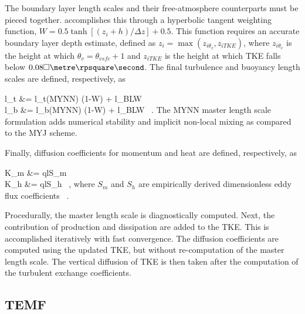 The boundary layer length scales and their free-atmosphere counterparts must be pieced together.  \citet{OlsonBrown2011} accomplishes this through a hyperbolic tangent weighting function, $W = 0.5 \tanh [ (z_i + h) / \Delta z] + 0.5$. This function requires an accurate boundary layer depth estimate, defined as $z_i = \max \left(z_{i\theta_v},z_{iTKE}\right)$, where $ z_{i\theta_v}$ is the height at which $\theta_v = \theta_{vsfc} +1$ and $z_{iTKE}$ is the height at which TKE falls below $0.08  \square\metre \rpsquare\second$. The final turbulence and buoyancy length scales are defined, respectively, as


\bse \label{equation354}
\bal
l_t &= l_{t(MYNN)} (1-W) + l_{BL}W \label{equation354a} \\
l_b &= l_{b(MYNN)} (1-W) + l_{BL}W \label{equation354b} \mbox{ .}
\eal
\ese
\noindent
 The MYNN master length scale formulation adds numerical stability and implicit non-local mixing as compared to the MYJ scheme.

Finally, diffusion coefficients for momentum and heat are defined, respectively, as

\bse \label{equation355}
\bal
K_m &= qlS_m \label{equation355a} \\
K_h &= qlS_h \label{equation355b} \mbox{ ,}
\eal
\ese
\noindent
 where $S_m$ and $S_h$ are empirically derived dimensionless eddy flux coefficients ~\citep{HL1988}.

Procedurally, the master length scale is diagnostically computed. Next, the contribution of production and dissipation are added to the TKE. This is accomplished iteratively with fast convergence. The diffusion coefficients are computed using the updated TKE, but without re-computation of the master length scale. The vertical diffusion of TKE is then taken after the computation of the turbulent exchange coefficients. 

\subsection{TEMF}
\label{pbl-temf-364}

